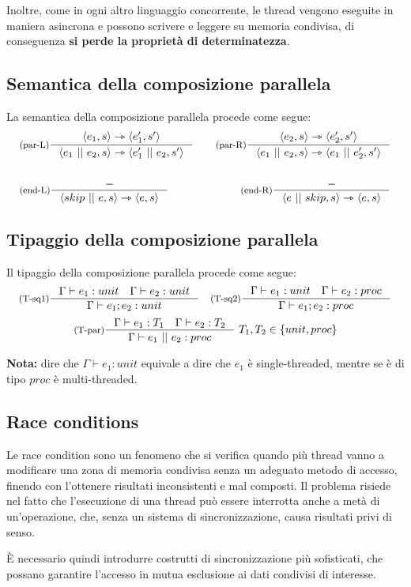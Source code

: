 \documentclass[a4paper, 11pt]{article}
\newcommand{\type}{\Gamma \vdash}
\newcommand{\goesto}{\rightarrowtriangle}
\newcommand{\compar}{\ ||\ }
\begin{document}
Inoltre, come in ogni altro linguaggio concorrente, le thread vengono eseguite in maniera asincrona e possono scrivere e leggere su memoria condivisa, di conseguenza \textbf{si perde la proprietà di determinatezza}.

\subsection{Semantica della composizione parallela}
La semantica della composizione parallela procede come segue: \begin{align*}
	&\inference[(par-L)]{\langle e_1, s\rangle \goesto \langle e_1', s' \rangle}{\langle e_1 \compar e_2,s \rangle \goesto \langle e_1' \compar e_2, s' \rangle} \quad &\inference[(par-R)]{\langle e_2, s\rangle \goesto \langle e_2', s' \rangle}{\langle e_1 \compar e_2,s \rangle \goesto \langle e_1 \compar e_2', s' \rangle} \\ \\
	&\inference[(end-L)]{-}{\langle skip \compar e, s \rangle \goesto \langle e,s \rangle} \quad &\inference[(end-R)]{-}{\langle e \compar skip,s \rangle \goesto \langle e,s \rangle}
	\end{align*}
	
\subsection{Tipaggio della composizione parallela}
Il tipaggio della composizione parallela procede come segue: \begin{align*}
	\inference[(T-sq1)]{\type e_1:unit \quad \type e_2:unit}{\type e_1;e_2:unit} \quad \inference[(T-sq2)]{\type e_1:unit \quad \type e_2:proc}{\type e_1;e_2:proc}
\end{align*}
\begin{align*}
	\inference[(T-par)]{\type e_1:T_1 \quad \type e_2:T_2}{\type e_1 \compar e_2:proc}\ T_1, T_2 \in \lbrace unit, proc \rbrace
\end{align*}

\textbf{Nota:} dire che $\type e_1:unit$ equivale a dire che $e_1$ è single-threaded, mentre se è di tipo $proc$ è multi-threaded.

\subsection{Race conditions}
Le race condition sono un fenomeno che si verifica quando più thread vanno a modificare una zona di memoria condivisa senza un adeguato metodo di accesso, finendo con l'ottenere risultati inconsistenti e mal composti. Il problema risiede nel fatto che l'esecuzione di una thread può essere interrotta anche a metà di un'operazione, che, senza un sistema di sincronizzazione, causa risultati privi di senso. 

È necessario quindi introdurre costrutti di sincronizzazione più sofisticati, che possano garantire l'accesso in mutua esclusione ai dati condivisi di interesse.
\end{document}
